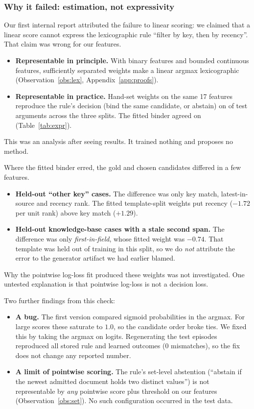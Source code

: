 \documentclass{article}
\begin{document}
\subsubsection{Why it failed: estimation, not expressivity}
\label{sec:exp-expr}
Our first internal report attributed the failure to linear scoring: we
claimed that a linear score cannot express the lexicographic rule ``filter by
key, then by recency''. That claim was wrong for our features.
\begin{itemize}
\item \textbf{Representable in principle.} With binary features and bounded
continuous features, sufficiently separated weights make a linear argmax
lexicographic (Observation~\ref{obs:lex}, Appendix~\ref{app:proofs}).
\item \textbf{Representable in practice.} Hand-set weights on the same 17
features reproduce the rule's decision (bind the same candidate, or abstain)
on \LexAgreeTotal{} of \ArgsTotal{} test arguments across the three splits.
The fitted binder agreed on \LearnAgreeTotal{} (Table~\ref{tab:expr}).
\end{itemize}
This was an analysis after seeing results. It trained nothing and proposes
no method.

Where the fitted binder erred, the gold and chosen candidates differed in a
few features.
\begin{itemize}
\item \textbf{Held-out ``other key'' cases.} The difference was only key
match, latest-in-source and recency rank. The fitted template-split weights put
recency ($-1.72$ per unit rank) above key match ($+1.29$).
\item \textbf{Held-out knowledge-base cases with a stale second span.} The
difference was only \emph{first-in-field}, whose fitted weight was
$-0.74$. That template was held out of training in this split, so we do
\emph{not} attribute the error to the generator artifact we had earlier
blamed.
\end{itemize}
Why the pointwise log-loss fit produced these weights was not investigated.
One untested explanation is that pointwise log-loss is not a decision loss.

Two further findings from this check:
\begin{itemize}
\item \textbf{A bug.} The first version compared sigmoid probabilities in
the argmax. For large scores these saturate to $1.0$, so the candidate order
broke ties. We fixed this by taking the argmax on logits. Regenerating the
test episodes reproduced all stored rule and learned outcomes (0
mismatches), so the fix does not change any reported number.
\item \textbf{A limit of pointwise scoring.} The rule's set-level abstention
(``abstain if the newest admitted document holds two distinct values'') is
not representable by \emph{any} pointwise score plus threshold on our
features (Observation~\ref{obs:set}). No such configuration occurred in the
test data.
\end{itemize}
\end{document}
